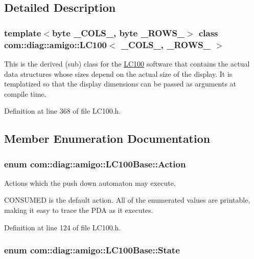 \subsection{Detailed Description}
\subsubsection*{template$<$byte \_\-COLS\_\-, byte \_\-ROWS\_\-$>$ class com::diag::amigo::LC100$<$ \_\-COLS\_\-, \_\-ROWS\_\- $>$}

This is the derived (sub) class for the \hyperlink{classcom_1_1diag_1_1amigo_1_1LC100}{LC100} software that contains the actual data structures whose sizes depend on the actual size of the display. It is templatized so that the display dimensions can be passed as arguments at compile time. 

Definition at line 368 of file LC100.h.



\subsection{Member Enumeration Documentation}
\hypertarget{classcom_1_1diag_1_1amigo_1_1LC100Base_afa1217f48472f7f6758733208ad14125}{
\subsubsection[{Action}]{\setlength{\rightskip}{0pt plus 5cm}enum {\bf com::diag::amigo::LC100Base::Action}}}
\label{classcom_1_1diag_1_1amigo_1_1LC100Base_afa1217f48472f7f6758733208ad14125}


Actions which the push down automaton may execute. 

CONSUMED is the default action. All of the enumerated values are printable, making it easy to trace the PDA as it executes. 

Definition at line 124 of file LC100.h.

\hypertarget{classcom_1_1diag_1_1amigo_1_1LC100Base_a13ddf5295a1d05a7d2d939941ba7266e}{
\subsubsection[{State}]{\setlength{\rightskip}{0pt plus 5cm}enum {\bf com::diag::amigo::LC100Base::State}}}
\label{classcom_1_1diag_1_1amigo_1_1LC100Base_a13ddf5295a1d05a7d2d939941ba7266e}


